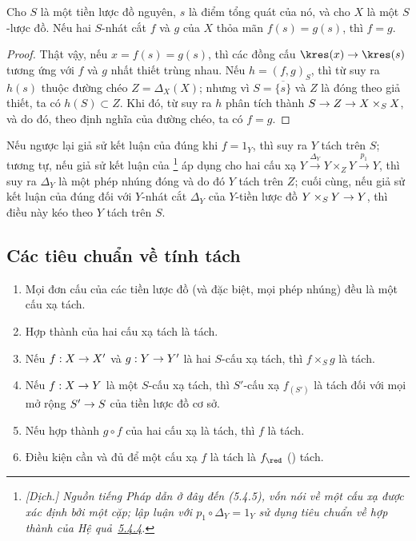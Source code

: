 \documentclass[oneside]{amsart}
\makeatletter
\newcommand{\ega@arrow}[2]{\mathchoice{#1}{#2}{#2}{#2}}
\renewcommand{\to}{\ega@arrow{\longrightarrow}{\rightarrow}}
\let\EGAOriginalLabel\label
\renewcommand{\label}[1]{\phantomsection\EGAOriginalLabel{#1}}
\makeatother
\begin{document}
\begin{corollary}[5.4.7]
\label{I.5.4.7}
Cho $S$ là một tiền lược đồ nguyên, $s$ là điểm tổng quát của nó, và cho $X$ là một $S$-lược đồ.
Nếu hai $S$-nhát cắt $f$ và $g$ của $X$ thỏa mãn $f(s)=g(s)$, thì $f=g$.
\end{corollary}

\begin{proof}
Thật vậy, nếu $x=f(s)=g(s)$, thì các đồng cấu $\kres(x)\to\kres(s)$ tương ứng với $f$ và $g$ nhất thiết trùng nhau.
Nếu $h=(f,g)_S$, thì từ  suy ra $h(s)$ thuộc đường chéo $Z=\Delta_X(X)$;
nhưng vì $S=\overline{\{s\}}$ và $Z$ là đóng theo giả thiết, ta có $h(S)\subset Z$.
Khi đó, từ  suy ra $h$ phân tích thành $S\to Z\to X\times_S X$, và do đó, theo định nghĩa của đường chéo, ta có $f=g$.
\end{proof}

\begin{remark}[5.4.8]
\label{I.5.4.8}
Nếu ngược lại giả sử kết luận của  đúng khi $f=1_Y$, thì suy ra $Y$ tách trên $S$;
tương tự, nếu giả sử kết luận của \footnote{\emph{[Dịch.] Nguồn tiếng Pháp dẫn ở đây đến (5.4.5), vốn nói về một cấu xạ được xác định bởi một cặp; lập luận với $p_1\circ\Delta_Y=1_Y$ sử dụng tiêu chuẩn về hợp thành của Hệ quả~\hyperref[I.5.4.4]{5.4.4}.}} áp dụng cho hai cấu xạ $Y\xrightarrow{\Delta_Y}Y\times_Z Y\xrightarrow{p_1}Y$, thì suy ra $\Delta_Y$ là một phép nhúng đóng và do đó $Y$ tách trên $Z$;
cuối cùng, nếu giả sử kết luận của  đúng đối với $Y$-nhát cắt $\Delta_Y$ của $Y$-tiền lược đồ $Y\times_S Y\to Y$, thì điều này kéo theo $Y$ tách trên $S$.
\end{remark}

\subsection{Các tiêu chuẩn về tính tách}
\label{subsection:I.5.5}

\begin{proposition}[5.5.1]
\label{I.5.5.1}
\begin{enumerate}
  \item[\rm(i)] Mọi đơn cấu của các tiền lược đồ (và đặc biệt, mọi phép
    nhúng) đều là một cấu xạ tách.
  \item[\rm(ii)] Hợp thành của hai cấu xạ tách là tách.
  \item[\rm(iii)] Nếu $f:X\to X'$ và $g:Y\to Y'$ là hai $S$-cấu xạ tách,
    thì $f\times_S g$ là tách.
  \item[\rm(iv)] Nếu $f:X\to Y$ là một $S$-cấu xạ tách, thì $S'$-cấu xạ
    $f_{(S')}$ là tách đối với mọi mở rộng $S'\to S$ của tiền lược đồ cơ sở.
  \item[\rm(v)] Nếu hợp thành $g\circ f$ của hai cấu xạ là tách, thì $f$ là
    tách.
  \item[\rm(vi)] Điều kiện cần và đủ để một cấu xạ $f$ là tách là
    $f_\red$ () tách.
\end{enumerate}
\end{proposition}
\end{document}
